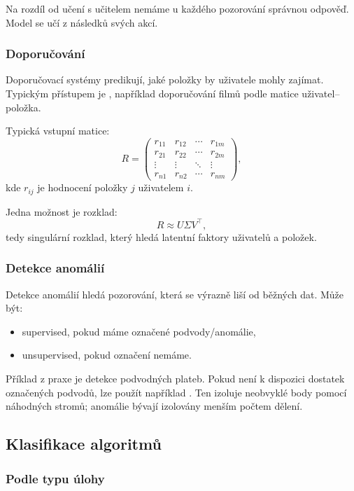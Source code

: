 Na rozdíl od učení s učitelem nemáme u každého pozorování správnou odpověď. Model se učí z následků
svých akcí.

\subsubsection{Doporučování}

Doporučovací systémy predikují, jaké položky by uživatele mohly zajímat. Typickým přístupem je
, například doporučování filmů podle matice uživatel--položka.

Typická vstupní matice:
\[
R =
\begin{pmatrix}
r_{11} & r_{12} & \cdots & r_{1m}\\
r_{21} & r_{22} & \cdots & r_{2m}\\
\vdots & \vdots & \ddots & \vdots\\
r_{n1} & r_{n2} & \cdots & r_{nm}
\end{pmatrix},
\]
kde $r_{ij}$ je hodnocení položky $j$ uživatelem $i$.

Jedna možnost je rozklad:
\[
R \approx U \Sigma V^\top,
\]
tedy singulární rozklad, který hledá latentní faktory uživatelů a položek.

\subsubsection{Detekce anomálií}

Detekce anomálií hledá pozorování, která se výrazně liší od běžných dat. Může být:
\begin{itemize}
    \item supervised, pokud máme označené podvody/anomálie,
    \item unsupervised, pokud označení nemáme.
\end{itemize}

Příklad z praxe je detekce podvodných plateb. Pokud není k dispozici dostatek označených podvodů, lze použít
například . Ten izoluje neobvyklé body pomocí náhodných stromů; anomálie bývají
izolovány menším počtem dělení.

\subsection{Klasifikace algoritmů}

\subsubsection{Podle typu úlohy}


